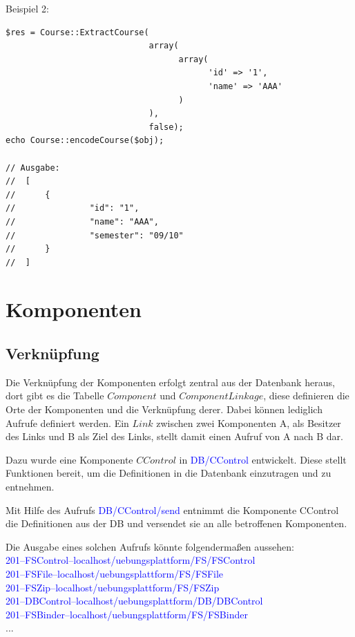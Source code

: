 \documentclass[10pt,a4paper,final,parskip]{scrartcl}
\newcommand{\blau}[1]{\textcolor{blue}{#1}}
\begin{document}
\begin{minipage}{\textwidth}
Beispiel 2:
\begin{lstlisting}
$res = Course::ExtractCourse(
                             array(
                                   array(
                                         'id' => '1',
                                         'name' => 'AAA'
                                   )
                             ),
                             false);
echo Course::encodeCourse($obj);

// Ausgabe: 
//  [
//	    {
//               "id": "1",
//               "name": "AAA",
//               "semester": "09/10"
//	    }
//  ]
\end{lstlisting}
\end{minipage}


 
 \section{Komponenten}
 
 \subsection{Verknüpfung}
Die Verknüpfung der Komponenten erfolgt zentral aus der Datenbank heraus, dort gibt es die Tabelle $Component$ und $ComponentLinkage$, diese definieren die Orte der Komponenten und die Verknüpfung derer. Dabei können lediglich Aufrufe definiert werden. Ein $Link$ zwischen zwei Komponenten A, als Besitzer des Links und B als Ziel des Links, stellt damit einen Aufruf von A nach B dar.

Dazu wurde eine Komponente $CControl$ in \blau{DB/CControl} entwickelt. Diese stellt Funktionen bereit, um die Definitionen in die Datenbank einzutragen und zu entnehmen.

Mit Hilfe des Aufrufs \blau{DB/CControl/send} entnimmt die Komponente CControl die Definitionen aus der DB und versendet sie an alle betroffenen Komponenten. 

Die Ausgabe eines solchen Aufrufs könnte folgendermaßen aussehen: \\
\blau{201--FSControl--localhost/uebungsplattform/FS/FSControl}\\
\blau{201--FSFile--localhost/uebungsplattform/FS/FSFile}\\
\blau{201--FSZip--localhost/uebungsplattform/FS/FSZip}\\
\blau{201--DBControl--localhost/uebungsplattform/DB/DBControl}\\
\blau{201--FSBinder--localhost/uebungsplattform/FS/FSBinder}\\
...\\
\end{document}
